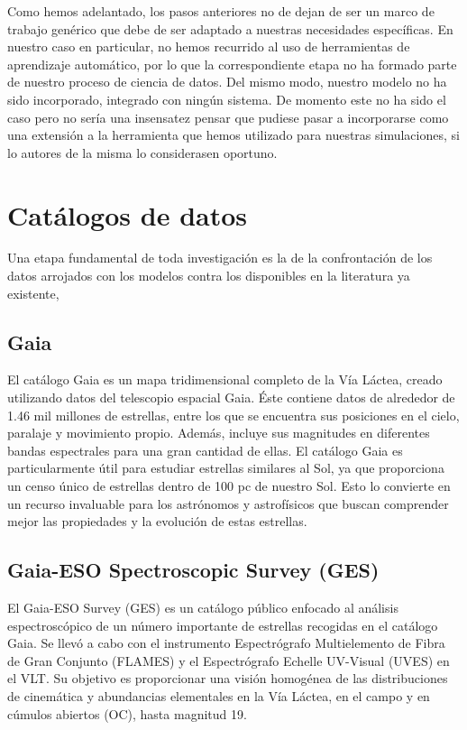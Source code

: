 Como hemos adelantado, los pasos anteriores no de dejan de ser un marco de trabajo genérico que debe de ser adaptado a nuestras necesidades específicas. En nuestro caso en particular, no hemos recurrido al uso de herramientas de aprendizaje automático, por lo que la correspondiente etapa no ha formado parte de nuestro proceso de ciencia de datos. Del mismo modo, nuestro modelo no ha sido incorporado, integrado con ningún sistema. De momento este no ha sido el caso pero no sería una insensatez pensar que pudiese pasar a incorporarse como una extensión a la herramienta que hemos utilizado para nuestras simulaciones, si lo autores de la misma lo considerasen oportuno.


\section{Catálogos de datos}
Una etapa fundamental de toda investigación es la de la confrontación de los datos arrojados con los modelos contra los disponibles en la literatura ya existente,

\subsection{Gaia}
El catálogo Gaia es un mapa tridimensional completo de la Vía Láctea, creado utilizando datos del telescopio espacial Gaia. Éste contiene datos de alrededor de 1.46 mil millones de estrellas, entre los que se encuentra sus posiciones en el cielo, paralaje y movimiento propio. Además, incluye sus magnitudes en diferentes bandas espectrales para una gran cantidad de ellas. El catálogo Gaia es particularmente útil para estudiar estrellas similares al Sol, ya que proporciona un censo único de estrellas dentro de 100 pc de nuestro Sol. Esto lo convierte en un recurso invaluable para los astrónomos y astrofísicos que buscan comprender mejor las propiedades y la evolución de estas estrellas.\par

\subsection{Gaia-ESO Spectroscopic Survey (GES)}
El Gaia-ESO Survey (GES) \cite{Gilmore2012,Randich2013,Randich2022} es un catálogo público enfocado al análisis espectroscópico de un número importante de estrellas recogidas en el catálogo Gaia. Se llevó a cabo con el instrumento Espectrógrafo Multielemento de Fibra de Gran Conjunto (FLAMES) y el Espectrógrafo Echelle UV-Visual (UVES) en el VLT. Su objetivo es proporcionar una visión homogénea de las distribuciones de cinemática y abundancias elementales en la Vía Láctea, en el campo y en cúmulos abiertos (OC), hasta magnitud 19.\par 

